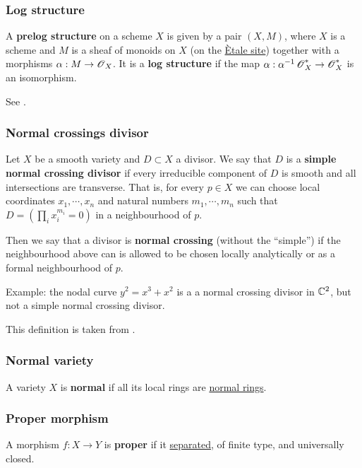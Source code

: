\documentclass[11pt, english]{article}
\begin{document}
\subsubsection{Log structure}
\label{logstructure}

A \textbf{prelog structure} on a scheme $X$ is given by a pair $(X,M)$, where $X$ is a scheme and $M$ is a sheaf of monoids on $X$ (on the \hyperref[etalesite]{Ètale site}) together with a morphisms $\alpha:M \to \operatorname{\mathscr{O}}_X$. It is a \textbf{log structure} if the map $\alpha:\alpha^{-1}\operatorname{\mathscr{O}}_X^\ast \to \operatorname{\mathscr{O}}_X^\ast$ is an isomorphism.

See \cite{kato_log}.

\subsubsection{Normal crossings divisor}
\label{normalcrossingsdivisor}

Let $X$ be a smooth variety and $D \subset X$ a divisor. We say that $D$ is a \textbf{simple normal crossing divisor} if every irreducible component of $D$ is smooth and all intersections are transverse. That is, for every $p \in X$ we can choose local coordinates $x_1,\cdots,x_n$ and natural numbers $m_1,\cdots,m_n$ such that $D=\left( \prod_{i} x_i^{m_i} =0 \right)$ in a neighbourhood of $p$.

Then we say that a divisor is \textbf{normal crossing} (without the ``simple'') if the neighbourhood above can is allowed to be chosen locally analytically or as a formal neighbourhood of $p$.

Example: the nodal curve $y^2=x^3+x^2$ is a a normal crossing divisor in $\mathbb{C}^2$, but not a simple normal crossing divisor.

This definition is taken from \cite{kollar_resolution}. 


\subsubsection{Normal variety}
\label{normalvariety}
A variety $X$ is \textbf{normal} if all its local rings are \hyperref[normalring]{normal rings}.

\subsubsection{Proper morphism}
\label{proper}
A morphism $f:X \to Y$ is \textbf{proper} if it \hyperref[separated]{separated}, of finite type, and universally closed.
\end{document}

